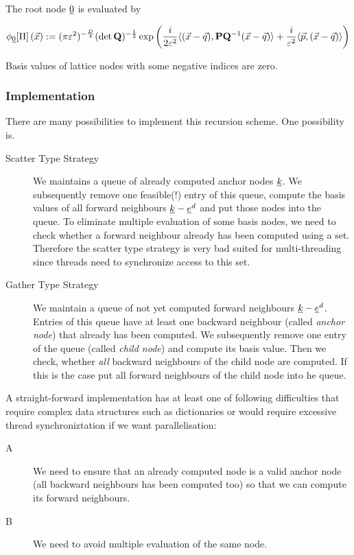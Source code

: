 \documentclass{article}
\begin{document}
The root node \(\underline{0}\) is evaluated by

\begin{equation}
  \label{eq:phi0_Dd}
  \phi_{\underline{0}}[\Pi]\left(\vec{x}\right)
  :=
  (\pi\varepsilon^2)^{-\frac{D}{4}} (\det\mathbf{Q})^{-\frac{1}{2}}
  \exp \left( \frac{i}{2\varepsilon^2}
    \langle (\vec{x}-\vec{q}) , \mathbf{P}\mathbf{Q}^\mathrm{-1}(\vec{x}-\vec{q}) \rangle
    + \frac{i}{\varepsilon^2} \langle \vec{p} , (\vec{x}-\vec{q}) \rangle
  \right)
\end{equation}

Basis values of lattice nodes with some negative indices are zero.

\subsubsection{Implementation}
There are many possibilities to implement this recursion scheme. One
possibility is.
\begin{description}
\item[Scatter Type Strategy] We maintains a queue of already computed
  anchor nodes \(\underline{k}\).  We subsequently remove one feasible(!)
  entry of this queue, compute the basis values of all forward
  neighbours \(\underline{k}-\underline{e}^d\) and put those nodes into the
  queue.  To eliminate multiple evaluation of some basis nodes, we
  need to check whether a forward neighbour already has been computed
  using a set.  Therefore the scatter type strategy is very bad suited
  for multi-threading since threads need to synchronize access to this
  set.
\item[Gather Type Strategy] We maintain a queue of not yet computed
  forward neighbours \(\underline{k}-\underline{e}^d\). Entries of this queue
  have at least one backward neighbour (called \emph{anchor node})
  that already has been computed.  We subsequently remove one entry of
  the queue (called \emph{child node}) and compute its basis value.
  Then we check, whether \emph{all} backward neighbours of the child
  node are computed. If this is the case put all forward neighbours of
  the child node into he queue.
\end{description}

A straight-forward implementation has at least one of following
difficulties that require complex data structures such as dictionaries
or would require excessive thread synchroniztation if we want
parallelisation:
\begin{description}
\item[A] We need to ensure that an already computed node is a valid
  anchor node (all backward neighbours has been computed too) so that
  we can compute its forward neighbours.
\item[B] We need to avoid multiple evaluation of the same node.
\end{description}
\end{document}
